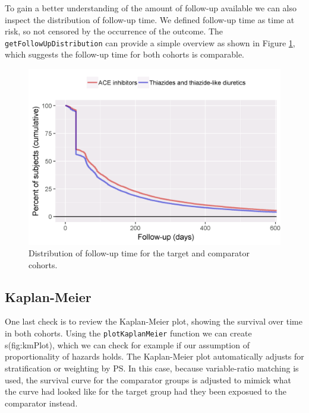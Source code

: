 \documentclass[]{book}
\begin{document}
To gain a better understanding of the amount of follow-up available we can also inspect the distribution of follow-up time. We defined follow-up time as time at risk, so not censored by the occurrence of the outcome. The \texttt{getFollowUpDistribution} can provide a simple overview as shown in Figure \ref{fig:followUp}, which suggests the follow-up time for both cohorts is comparable.

\begin{figure}

{\centering \includegraphics[width=0.8\linewidth]{images/PopulationLevelEstimation/followUp} 

}

\caption{Distribution of follow-up time for the target and comparator cohorts.}\label{fig:followUp}
\end{figure}

\hypertarget{kaplan-meier}{%
\subsection{Kaplan-Meier}\label{kaplan-meier}}

One last check is to review the Kaplan-Meier plot, showing the survival over time in both cohorts. Using the \texttt{plotKaplanMeier} function we can create s(fig:kmPlot), which we can check for example if our assumption of proportionality of hazards holds. The Kaplan-Meier plot automatically adjusts for stratification or weighting by PS. In this case, because variable-ratio matching is used, the survival curve for the comparator groups is adjusted to mimick what the curve had looked like for the target group had they been exposued to the comparator instead.  
\end{document}
